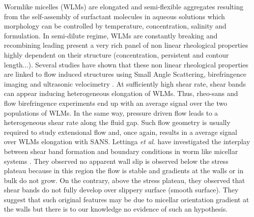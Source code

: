 \documentclass[12pt]{article}
\begin{document}
Wormlike micelles (WLMs) are elongated and semi-flexible aggregates resulting from
the self-assembly of surfactant molecules in aqueous solutions which morphology can be controlled by temperature, concentration, salinity and formulation. In semi-dilute regime, WLMs are constantly breaking and recombining leading present a very rich panel of non linear rheological properties highly dependent on their structure (concentration, persistent and contour length...). Several studies have shown that these non linear rheological properties are linked to flow induced structures using Small Angle Scattering, birefringence imaging and ultrasonic velocimetry \cite{berretShearInducedIsotropictoNematicPhase1994, salmonVelocityProfilesShearBanding2003, lerougeShearBandingMicellar1998}. At sufficiently high shear rate, shear bands can appear inducing heterogeneous elongation of WLMs. Thus, rheo-sans and flow birefringence experiments end up with an average signal over the two populations of WLMs.  In the same way, pressure driven flow leads to a heterogeneous shear rate along the fluid gap. Such flow geometry is usually required to study extensional flow \cite{prudhommeElongationalFlowSolutions1994, lutz-buenoMicellarSolutionsContraction2015} and, once again, results in a average signal over WLMs elongation with SANS.
Lettinga \textit{et al.} have investigated the interplay between shear band formation and boundary conditions in worm like micellar systems \cite{lettingaCompetitionShearBanding2009}. They observed no apparent wall slip is observed below the stress plateau because in this region the  flow is stable and gradients at the walls or in bulk do not grow. On the contrary, above the stress plateau, they observed that shear bands do not fully develop over slippery  surface (smooth surface). They suggest that such original features may be due to micellar orientation gradient at the walls but there is to our knowledge no evidence of such an hypothesis.
\end{document}
